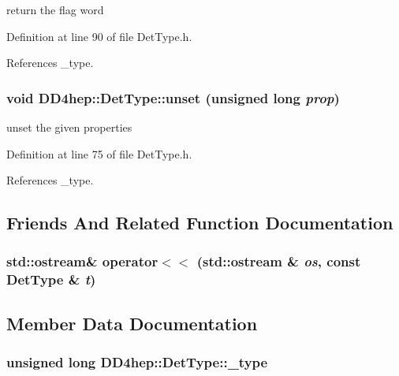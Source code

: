 return the flag word 

Definition at line 90 of file DetType.h.

References \_\-type.\hypertarget{class_d_d4hep_1_1_det_type_aad9477be2d3a9a23cb1edb0d2435ad31}{
\subsubsection[{unset}]{\setlength{\rightskip}{0pt plus 5cm}void DD4hep::DetType::unset (unsigned long {\em prop})}}
\label{class_d_d4hep_1_1_det_type_aad9477be2d3a9a23cb1edb0d2435ad31}


unset the given properties 

Definition at line 75 of file DetType.h.

References \_\-type.

\subsection{Friends And Related Function Documentation}
\hypertarget{class_d_d4hep_1_1_det_type_a41fbd8f60c0ec1ac2866c6dc20c628f5}{
\subsubsection[{operator$<$$<$}]{\setlength{\rightskip}{0pt plus 5cm}std::ostream\& operator$<$$<$ (std::ostream \& {\em os}, \/  const {\bf DetType} \& {\em t})}}
\label{class_d_d4hep_1_1_det_type_a41fbd8f60c0ec1ac2866c6dc20c628f5}


\subsection{Member Data Documentation}
\hypertarget{class_d_d4hep_1_1_det_type_aa9653f5359e75679f73761809ed5923d}{
\subsubsection[{\_\-type}]{\setlength{\rightskip}{0pt plus 5cm}unsigned long {\bf DD4hep::DetType::\_\-type}}}
\label{class_d_d4hep_1_1_det_type_aa9653f5359e75679f73761809ed5923d}


